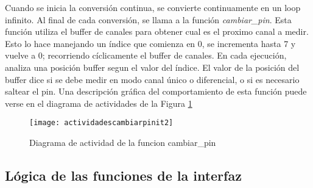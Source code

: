 Cuando se inicia la conversión continua, se convierte continuamente en un loop infinito. Al final de cada conversión, se llama a la función \textit{cambiar\_pin}. Esta función utiliza el buffer de canales para obtener cual es el proximo canal a medir. Esto lo hace manejando un índice que comienza en 0, se incrementa hasta 7 y vuelve a 0; recorriendo cíclicamente el buffer de canales. 
En cada ejecución, analiza una posición buffer segun el valor del índice. El valor de la posición del buffer dice si se debe medir en modo canal único o diferencial, o si es necesario saltear el pin. Una descripción gráfica del comportamiento de esta función puede verse en el diagrama de actividades de la Figura \ref{fig:actividadescambiarpinit2} \\


\begin{figure}[h]
  \centering
  \texttt{[image: actividadescambiarpinit2]}
  \caption{Diagrama de actividad de la funcion cambiar\_pin}\label{fig:actividadescambiarpinit2}
\end{figure}




\subsection{Lógica de las funciones de la interfaz} %
\label{it2:sub:logica_de_las_funciones_de_la_interfaz}

